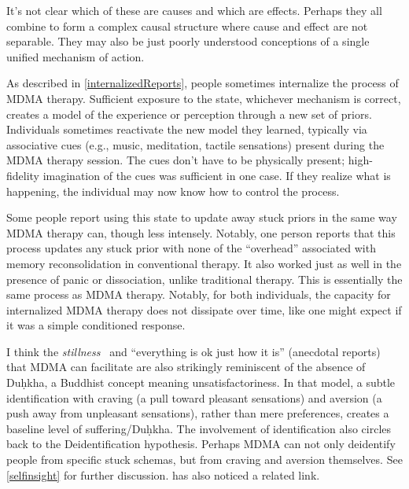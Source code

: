 \documentclass[11pt,oneside]{book}
\let\cite\parencite
\begin{document}
It's not clear which of these are causes and which are effects. Perhaps they all combine to form a complex causal structure where cause and effect are not separable. They may also be just poorly understood conceptions of a single unified mechanism of action.

As described in \cref{internalizedReports}, people sometimes internalize the process of MDMA therapy. Sufficient exposure to the state, whichever mechanism is correct, creates a model of the experience or perception through a new set of priors. Individuals sometimes reactivate the new model they learned, typically via associative cues (e.g., music, meditation, tactile sensations) present during the MDMA therapy session. The cues don't have to be physically present; high-fidelity imagination of the cues was sufficient in one case. If they realize what is happening, the individual may now know how to control the process.

Some people report using this state to update away stuck priors in the same way MDMA therapy can, though less intensely. Notably, one person reports that this process updates any stuck prior with none of the \enquote{overhead} associated with memory reconsolidation in conventional therapy. It also worked just as well in the presence of panic or dissociation, unlike traditional therapy. This is essentially the same process as MDMA therapy. Notably, for both individuals, the capacity for internalized MDMA therapy does not dissipate over time, like one might expect if it was a simple conditioned response.

I think the \textit{stillness}~\cite{stockerConnectogen} and \enquote{everything is ok just how it is} (anecdotal reports) that MDMA can facilitate are also strikingly reminiscent of the absence of Duḥkha, a Buddhist concept meaning unsatisfactoriness. In that model, a subtle identification with craving (a pull toward pleasant sensations) and aversion (a push away from unpleasant sensations), rather than mere preferences, creates a baseline level of suffering/Duḥkha. The involvement of identification also circles back to the Deidentification hypothesis. Perhaps MDMA can not only deidentify people from specific stuck schemas, but from craving and aversion themselves. See \cref{selfinsight} for further discussion. \textcite{ingramMDMA} has also noticed a related link.
\end{document}
